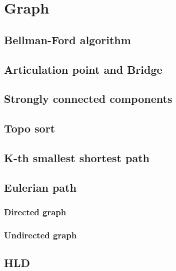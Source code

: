 \section{Graph}

\subsection{Bellman-Ford algorithm}

\subsection{Articulation point and Bridge}

\subsection{Strongly connected components}

\subsection{Topo sort}

\subsection{K-th smallest shortest path}

\subsection{Eulerian path}
  \subsubsection{Directed graph}

  \subsubsection{Undirected graph}

\subsection{HLD}
